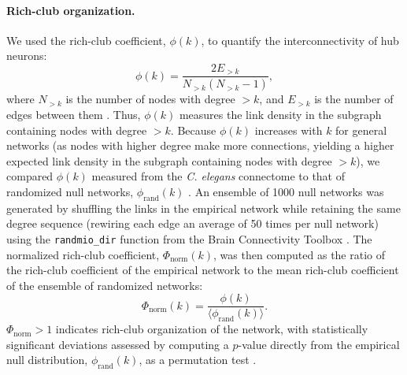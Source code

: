 \documentclass[10pt,letterpaper]{article}
\begin{document}
\paragraph{Rich-club organization.}
We used the rich-club coefficient, $\phi(k)$, to quantify the interconnectivity of hub neurons:
\begin{equation}
    \label{eqn:rich_club}
    \phi(k) = \frac{2E_{>k}}{N_{>k}(N_{>k}-1)},
\end{equation}
where $N_{>k}$ is the number of nodes with degree $>k$, and $E_{>k}$ is the number of edges between them  \cite{Colizza:2006kz}.
Thus, $\phi(k)$ measures the link density in the subgraph containing nodes with degree $>k$.
Because $\phi(k)$ increases with $k$ for general networks (as nodes with higher degree make more connections, yielding a higher expected link density in the subgraph containing nodes with degree $>k$), we compared $\phi(k)$ measured from the \emph{C. elegans} connectome to that of randomized null networks, $\phi_\mathrm{rand}(k)$ \cite{Colizza:2006kz}.
An ensemble of 1000 null networks was generated by shuffling the links in the empirical network while retaining the same degree sequence \cite{Maslov:2002hi} (rewiring each edge an average of 50 times per null network) using the \texttt{randmio\_dir} function from the Brain Connectivity Toolbox \cite{Rubinov:2010jd}.
The normalized rich-club coefficient, $\Phi_\mathrm{norm}(k)$, was then computed as the ratio of the rich-club coefficient of the empirical network to the mean rich-club coefficient of the ensemble of randomized networks:
\begin{equation}
    \label{eqn:rich_club_norm}
    \Phi_\mathrm{norm}(k) = \frac{\phi(k)}{\langle \phi_\mathrm{rand}(k) \rangle}.
\end{equation}
$\Phi_\mathrm{norm} > 1$ indicates rich-club organization of the network, with statistically significant deviations assessed by computing a $p$-value directly from the empirical null distribution, $\phi_\mathrm{rand}(k)$, as a permutation test \cite{vandenHeuvel:2011he}.

\end{document}
